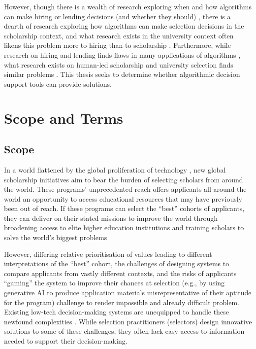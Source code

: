 However, though there is a wealth of research exploring when and how algorithms can make hiring or lending decisions (and whether they should) \cite{schmidt1998validity,schumann2017diverse,raghavan2020mitigating,horodyski_applicants_2023,Leung_Zhang_Jibuti_Zhao_Klein_Pierce_Robert_Zhu_2020}, there is a dearth of research exploring how algorithms can make selection decisions in the scholarship context, and what research exists in the university context often likens this problem more to hiring than to scholarship \cite{schumann2017diverse}. Furthermore, while research on hiring and lending finds flaws in many applications of algorithms \cite{raghavan2020mitigating,horodyski_applicants_2023}, what research exists on human-led scholarship and university selection finds similar problems \cite{Peng_Nushi_Kıcıman_Inkpen_Suri_Kamar_2019}. This thesis seeks to determine whether algorithmic decision support tools can provide solutions.

\section{Scope and Terms}
\subsection{Scope}
In a world flattened by the global proliferation of technology \cite{Friedman_2005}, new global scholarship initiatives aim to bear the burden of selecting scholars from around the world. These programs' unprecedented reach offers applicants all around the world an opportunity to access educational resources that may have previously been out of reach. If these programs can select the ``best'' cohorts of applicants, they can deliver on their stated missions to improve the world through broadening access to elite higher education institutions and training scholars to solve the world's biggest problems

However, differing relative prioritisation of values leading to different interpretations of the ``best'' cohort, the challenges of designing systems to compare applicants from vastly different contexts, and the risks of applicants ``gaming'' the system to improve their chances at selection (e.g., by using generative AI to produce application materials misrepresentative of their aptitude for the program) challenge to render impossible and already difficult problem. Existing low-tech decision-making systems are unequipped to handle these newfound complexities \cite{Latzer_Hollnbuchner_Just_Saurwein_2014}. While selection practitioners (selectors) design innovative solutions to some of these challenges, they often lack easy access to information needed to support their decision-making.

